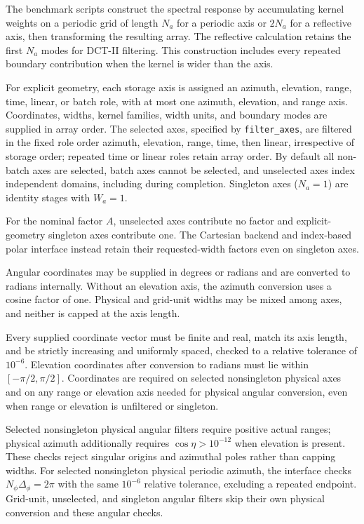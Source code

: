 \documentclass[a4paper,fleqn]{cas-sc}
\begin{document}
The benchmark scripts construct the spectral response by accumulating kernel weights on a periodic grid of length $N_a$ for a periodic axis or $2N_a$ for a reflective axis, then transforming the resulting array. The reflective calculation retains the first $N_a$ modes for DCT-II filtering. This construction includes every repeated boundary contribution when the kernel is wider than the axis.

For explicit geometry, each storage axis is assigned an azimuth, elevation, range, time, linear, or batch role, with at most one azimuth, elevation, and range axis. Coordinates, widths, kernel families, width units, and boundary modes are supplied in array order. The selected axes, specified by \texttt{filter\_axes}, are filtered in the fixed role order azimuth, elevation, range, time, then linear, irrespective of storage order; repeated time or linear roles retain array order. By default all non-batch axes are selected, batch axes cannot be selected, and unselected axes index independent domains, including during completion. Singleton axes ($N_a=1$) are identity stages with $W_a=1$.

For the nominal factor $A$, unselected axes contribute no factor and explicit-geometry singleton axes contribute one. The Cartesian backend and index-based polar interface instead retain their requested-width factors even on singleton axes.

Angular coordinates may be supplied in degrees or radians and are converted to radians internally. Without an elevation axis, the azimuth conversion uses a cosine factor of one. Physical and grid-unit widths may be mixed among axes, and neither is capped at the axis length.

Every supplied coordinate vector must be finite and real, match its axis length, and be strictly increasing and uniformly spaced, checked to a relative tolerance of $10^{-6}$. Elevation coordinates after conversion to radians must lie within $[-\pi/2,\pi/2]$. Coordinates are required on selected nonsingleton physical axes and on any range or elevation axis needed for physical angular conversion, even when range or elevation is unfiltered or singleton.

Selected nonsingleton physical angular filters require positive actual ranges; physical azimuth additionally requires $\cos\eta>10^{-12}$ when elevation is present. These checks reject singular origins and azimuthal poles rather than capping widths. For selected nonsingleton physical periodic azimuth, the interface checks $N_\phi\Delta_\phi=2\pi$ with the same $10^{-6}$ relative tolerance, excluding a repeated endpoint. Grid-unit, unselected, and singleton angular filters skip their own physical conversion and these angular checks.
\end{document}
